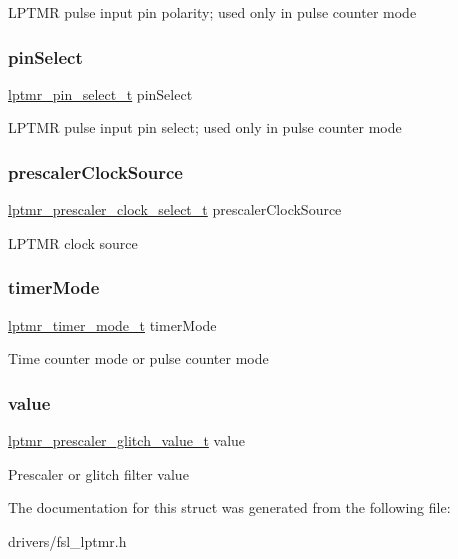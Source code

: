 L\+P\+T\+MR pulse input pin polarity; used only in pulse counter mode \mbox{\label{struct__lptmr__config_a7c71a38b1b8ae8b3b1c967907c42bc96}} 
\subsubsection{\texorpdfstring{pinSelect}{pinSelect}}
{\footnotesize\ttfamily \mbox{\hyperlink{group__lptmr_ga37c4ca922036c3e0e5af194799d3cfad}{lptmr\+\_\+pin\+\_\+select\+\_\+t}} pin\+Select}

L\+P\+T\+MR pulse input pin select; used only in pulse counter mode \mbox{\label{struct__lptmr__config_aca122d02b13f8e68664957cdcef73ceb}} 
\subsubsection{\texorpdfstring{prescalerClockSource}{prescalerClockSource}}
{\footnotesize\ttfamily \mbox{\hyperlink{group__lptmr_ga63bfd703c032aeb0820e8131c4720cb8}{lptmr\+\_\+prescaler\+\_\+clock\+\_\+select\+\_\+t}} prescaler\+Clock\+Source}

L\+P\+T\+MR clock source \mbox{\label{struct__lptmr__config_aadb8b183b22fff58a9360a3c2a1c68ff}} 
\subsubsection{\texorpdfstring{timerMode}{timerMode}}
{\footnotesize\ttfamily \mbox{\hyperlink{group__lptmr_ga507b12d91dad8bbc571b4d651d3a17c2}{lptmr\+\_\+timer\+\_\+mode\+\_\+t}} timer\+Mode}

Time counter mode or pulse counter mode \mbox{\label{struct__lptmr__config_a093529e7e6dc5a0d6ed25e66674f9736}} 
\subsubsection{\texorpdfstring{value}{value}}
{\footnotesize\ttfamily \mbox{\hyperlink{group__lptmr_gad3d903364803228c64b5b650c2624ac0}{lptmr\+\_\+prescaler\+\_\+glitch\+\_\+value\+\_\+t}} value}

Prescaler or glitch filter value 

The documentation for this struct was generated from the following file\+:\begin{DoxyCompactItemize}
\item 
drivers/fsl\+\_\+lptmr.\+h\end{DoxyCompactItemize}
